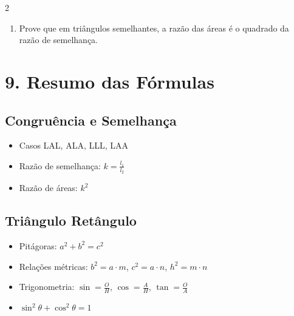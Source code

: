 \documentclass[11pt]{article}
\begin{document}
\begin{multicols}{2}
\begin{enumerate}
    \item Prove que em triângulos semelhantes, a razão das áreas é o quadrado da razão de semelhança.
\end{enumerate}

\section*{9. Resumo das Fórmulas}

\subsection*{Congruência e Semelhança}
\begin{itemize}
    \item Casos LAL, ALA, LLL, LAA
    \item Razão de semelhança: $k = \frac{l_1}{l_2}$
    \item Razão de áreas: $k^2$
\end{itemize}

\subsection*{Triângulo Retângulo}
\begin{itemize}
    \item Pitágoras: $a^2 + b^2 = c^2$
    \item Relações métricas: $b^2 = a \cdot m$, $c^2 = a \cdot n$, $h^2 = m \cdot n$
    \item Trigonometria: $\sin = \frac{O}{H}$, $\cos = \frac{A}{H}$, $\tan = \frac{O}{A}$
    \item $\sin^2\theta + \cos^2\theta = 1$
\end{itemize}

\end{multicols}
\end{document}
